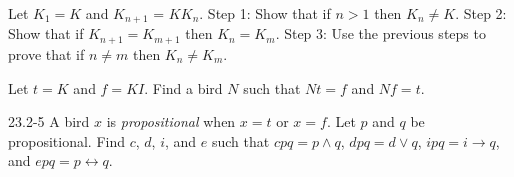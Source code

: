 \documentclass[12pt, letterpaper]{article}
\begin{document}
\begin{prob}{22.19}
Let $K_1 = K$ and $K_{n+1}$ = $KK_n$. Step 1: Show that if $n > 1$ then $K_n \neq K$. Step 2: Show that if $K_{n+1} = K_{m+1}$ then $K_n = K_m$. Step 3: Use the previous steps to prove that if $n \neq m$ then $K_n \neq K_m$.
\end{prob}

\begin{prob}{23.1}
Let $t = K$ and $f = KI$. Find a bird $N$ such that $Nt = f$ and $Nf = t$.
\end{prob}

\begin{prob}{23.2-5}
A bird $x$ is \emph{propositional} when $x = t$ or $x = f$. Let $p$ and $q$ be propositional. Find $c$, $d$, $i$, and $e$ such that $cpq = p \wedge q$, $dpq = d \vee q$, $ipq = i \to q$, and $epq = p \leftrightarrow q$.
\end{prob}
\end{document}
